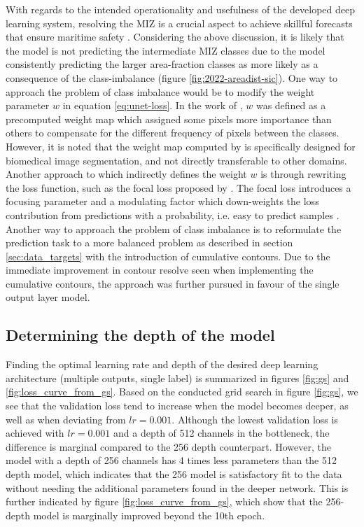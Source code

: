 \documentclass[../main/thesis]{subfiles}
\begin{document}
With regards to the intended operationality and usefulness of the developed deep learning system, resolving the MIZ is a crucial aspect to achieve skillful forecasts that ensure maritime safety \citep{Wagner2020}. Considering the above discussion, it is likely that the model is not predicting the intermediate MIZ classes due to the model consistently predicting the larger area-fraction classes as more likely as a consequence of the class-imbalance (figure \ref{fig:2022-areadist-sic}). One way to approach the problem of class imbalance would be to modify the weight parameter $w$ in equation \ref{eq:unet-loss}. In the work of \citet{Ronneberger2015}, $w$ was defined as a precomputed weight map which assigned some pixels more importance than others to compensate for the different frequency of pixels between the classes. However, it is noted that the weight map computed by \citep{Ronneberger2015} is specifically designed for biomedical image segmentation, and not directly transferable to other domains. Another approach to which indirectly defines the weight $w$ is through rewriting the loss function, such as the focal loss proposed by \citet{Lin2017}. The focal loss introduces a focusing parameter and a modulating factor which down-weights the loss contribution from predictions with a probability, i.e. easy to predict samples \citep{Lin2017}. Another way to approach the problem of class imbalance is to reformulate the prediction task to a more balanced problem as described in section \ref{sec:data_targets} with the introduction of cumulative contours. Due to the immediate improvement in contour resolve seen when implementing the cumulative contours, the approach was further pursued in favour of the single output layer model.

\subsection{Determining the depth of the model}
\label{sec:discuss_depth}
Finding the optimal learning rate and depth of the desired deep learning architecture (multiple outputs, single label) is summarized in figures \ref{fig:gs} and \ref{fig:loss_curve_from_gs}. Based on the conducted grid search in figure \ref{fig:gs}, we see that the validation loss tend to increase when the model becomes deeper, as well as when deviating from $lr = 0.001$. Although the lowest validation loss is achieved with $lr = 0.001$ and a depth of 512 channels in the bottleneck, the difference is marginal compared to the 256 depth counterpart. However, the model with a depth of 256 channels has 4 times less parameters than the 512 depth model, which indicates that the 256 model is satisfactory fit to the data without needing the additional parameters found in the deeper network. This is further indicated by figure \ref{fig:loss_curve_from_gs}, which show that the 256-depth model is marginally improved beyond the 10th epoch. 
\end{document}
